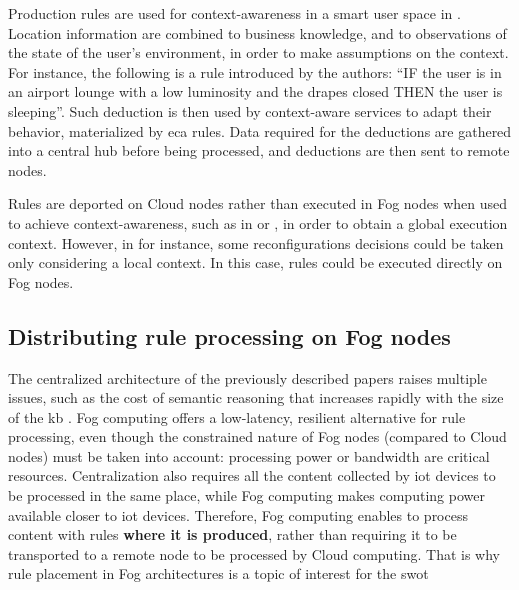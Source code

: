 \documentclass{iosart2c}
\begin{document}
Production rules are used for context-awareness in a smart user space in \cite{Hussein2016}.
Location information are combined to business knowledge, and to observations of the state of the user's environment, in order to make assumptions on the context.
For instance, the following is a rule introduced by the authors: ``IF the user is in an airport lounge with a low luminosity and the drapes closed THEN the user is sleeping''.
Such deduction is then used by context-aware services to adapt their behavior, materialized by \gls{eca} rules.
Data required for the deductions are gathered into a central hub before being processed, and deductions are then sent to remote nodes.

Rules are deported on Cloud nodes rather than executed in Fog nodes when used to achieve context-awareness, such as in \cite{Evchina2015} or \cite{Hussein2016}, in order to obtain a global execution context.
However, in \cite{Rodriguez2010} for instance, some reconfigurations decisions could be taken only considering a local context. 
In this case, rules could be executed directly on Fog nodes.

\subsection{Distributing rule processing on Fog nodes}

The centralized architecture of the previously described papers raises multiple issues, such as the cost of semantic reasoning that increases rapidly with the size of the \gls{kb} \cite{Maarala2017}.
Fog computing offers a low-latency, resilient alternative for rule processing, even though the constrained nature of Fog nodes (compared to Cloud nodes) must be taken into account: processing power or bandwidth are critical resources.
Centralization also requires all the content collected by \gls{iot} devices to be processed in the same place, while Fog computing makes computing power available closer to \gls{iot} devices.
Therefore, Fog computing enables to process content with rules \textbf{where it is produced}, rather than requiring it to be transported to a remote node to be processed by Cloud computing.
That is why rule placement in Fog architectures is a topic of interest for the \gls{swot}
\end{document}
